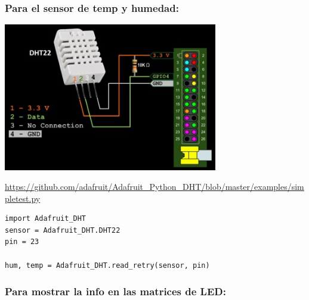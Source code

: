 \subsubsection{Para el \textbf{sensor} de temp y humedad:}\label{para-el-sensor-de-temp-y-humedad}

\includegraphics[width=0.7\textwidth,keepaspectratio]{img/sensor.jpg}

\url{https://github.com/adafruit/Adafruit_Python_DHT/blob/master/examples/simpletest.py}\\
\begin{verbatim}
import Adafruit_DHT
sensor = Adafruit_DHT.DHT22
pin = 23

hum, temp = Adafruit_DHT.read_retry(sensor, pin)
\end{verbatim}

\subsubsection{Para mostrar la info en las \textbf{matrices de
LED}:}\label{para-mostrar-la-info-en-las-matrices-de-led}


